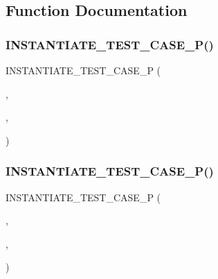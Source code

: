 \subsection{Function Documentation}
\mbox{\label{_obj__test_2lib_2googletest-release-1_88_81_2googletest_2test_2googletest-test2__test_8cc_a433ad86af147648bc394f0f37016f336}} 
\subsubsection{\texorpdfstring{INSTANTIATE\_TEST\_CASE\_P()}{INSTANTIATE\_TEST\_CASE\_P()}\hspace{0.1cm}{\footnotesize\ttfamily [1/2]}}
{\footnotesize\ttfamily I\+N\+S\+T\+A\+N\+T\+I\+A\+T\+E\+\_\+\+T\+E\+S\+T\+\_\+\+C\+A\+S\+E\+\_\+P (\begin{DoxyParamCaption}\item[{Multiples\+Of33}]{,  }\item[{\mbox{\hyperlink{class_external_instantiation_test}{External\+Instantiation\+Test}}}]{,  }\item[{Values(33, 66)}]{ }\end{DoxyParamCaption})}

\mbox{\label{_obj__test_2lib_2googletest-release-1_88_81_2googletest_2test_2googletest-test2__test_8cc_a06b097d2f2746a785ab07df0cc2e80a2}} 
\subsubsection{\texorpdfstring{INSTANTIATE\_TEST\_CASE\_P()}{INSTANTIATE\_TEST\_CASE\_P()}\hspace{0.1cm}{\footnotesize\ttfamily [2/2]}}
{\footnotesize\ttfamily I\+N\+S\+T\+A\+N\+T\+I\+A\+T\+E\+\_\+\+T\+E\+S\+T\+\_\+\+C\+A\+S\+E\+\_\+P (\begin{DoxyParamCaption}\item[{Sequence2}]{,  }\item[{\mbox{\hyperlink{class_instantiation_in_multiple_translaion_units_test}{Instantiation\+In\+Multiple\+Translaion\+Units\+Test}}}]{,  }\item[{Values(42 $\ast$3, 42 $\ast$4, 42 $\ast$5)}]{ }\end{DoxyParamCaption})}



